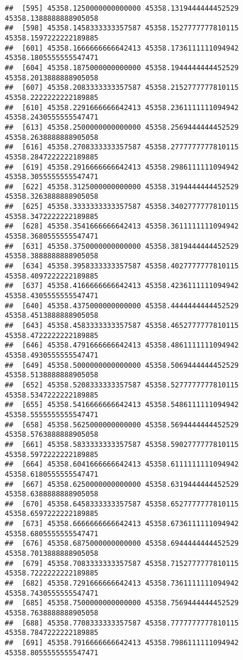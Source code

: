 \documentclass[
]{article}
\begin{document}
\begin{verbatim}
##  [595] 45358.1250000000000000 45358.1319444444452529 45358.1388888888905058
##  [598] 45358.1458333333357587 45358.1527777777810115 45358.1597222222189885
##  [601] 45358.1666666666642413 45358.1736111111094942 45358.1805555555547471
##  [604] 45358.1875000000000000 45358.1944444444452529 45358.2013888888905058
##  [607] 45358.2083333333357587 45358.2152777777810115 45358.2222222222189885
##  [610] 45358.2291666666642413 45358.2361111111094942 45358.2430555555547471
##  [613] 45358.2500000000000000 45358.2569444444452529 45358.2638888888905058
##  [616] 45358.2708333333357587 45358.2777777777810115 45358.2847222222189885
##  [619] 45358.2916666666642413 45358.2986111111094942 45358.3055555555547471
##  [622] 45358.3125000000000000 45358.3194444444452529 45358.3263888888905058
##  [625] 45358.3333333333357587 45358.3402777777810115 45358.3472222222189885
##  [628] 45358.3541666666642413 45358.3611111111094942 45358.3680555555547471
##  [631] 45358.3750000000000000 45358.3819444444452529 45358.3888888888905058
##  [634] 45358.3958333333357587 45358.4027777777810115 45358.4097222222189885
##  [637] 45358.4166666666642413 45358.4236111111094942 45358.4305555555547471
##  [640] 45358.4375000000000000 45358.4444444444452529 45358.4513888888905058
##  [643] 45358.4583333333357587 45358.4652777777810115 45358.4722222222189885
##  [646] 45358.4791666666642413 45358.4861111111094942 45358.4930555555547471
##  [649] 45358.5000000000000000 45358.5069444444452529 45358.5138888888905058
##  [652] 45358.5208333333357587 45358.5277777777810115 45358.5347222222189885
##  [655] 45358.5416666666642413 45358.5486111111094942 45358.5555555555547471
##  [658] 45358.5625000000000000 45358.5694444444452529 45358.5763888888905058
##  [661] 45358.5833333333357587 45358.5902777777810115 45358.5972222222189885
##  [664] 45358.6041666666642413 45358.6111111111094942 45358.6180555555547471
##  [667] 45358.6250000000000000 45358.6319444444452529 45358.6388888888905058
##  [670] 45358.6458333333357587 45358.6527777777810115 45358.6597222222189885
##  [673] 45358.6666666666642413 45358.6736111111094942 45358.6805555555547471
##  [676] 45358.6875000000000000 45358.6944444444452529 45358.7013888888905058
##  [679] 45358.7083333333357587 45358.7152777777810115 45358.7222222222189885
##  [682] 45358.7291666666642413 45358.7361111111094942 45358.7430555555547471
##  [685] 45358.7500000000000000 45358.7569444444452529 45358.7638888888905058
##  [688] 45358.7708333333357587 45358.7777777777810115 45358.7847222222189885
##  [691] 45358.7916666666642413 45358.7986111111094942 45358.8055555555547471

\end{verbatim}
\end{document}
